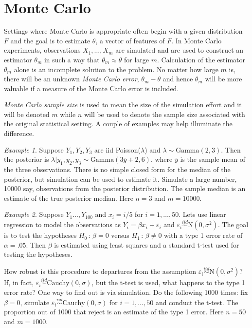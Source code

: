 \documentclass[12pt]{article}
\theoremstyle{plain}
\theoremstyle{definition}
\theoremstyle{remark}
\newtheorem{example}{Example}[section]
\begin{document}
\section{Monte Carlo}
\label{gofmc:sec:Monte Carlo}

Settings where Monte Carlo is appropriate often begin with a given
distribution $F$ and the goal is to estimate $\theta$, a vector of
features of $F$.  In Monte Carlo experiments, observations
$X_{1}, \ldots, X_{m}$ are simulated and are used to construct an
estimator $\theta_m$ in such a way that $\theta_m \approx \theta$ for
large $m$.  Calculation of the estimator $\theta_m$ alone is an
incomplete solution to the problem. No matter how large $m$ is, there
will be an unknown \textit{Monte Carlo error}, $\theta_m - \theta$ and
hence $\theta_m$ will be more valuable if a measure of the
Monte Carlo error is included. 

\textit{Monte Carlo sample size} is used to mean the size of the
simulation effort and it will be denoted $m$ while $n$ will be used to
denote the sample size associated with the original statistical
setting.  A couple of examples may help illuminate the difference.

\begin{example}
  Suppose $Y_1,Y_2, Y_3$ are iid Poisson($\lambda$) and $\lambda \sim
  \text{Gamma}(2,3)$.  Then the posterior is $\lambda| y_1, y_2, y_3
  \sim \text{Gamma}(3\bar{y} + 2, 6)$, where $\bar{y}$ is the sample
  mean of the three observations.  There is no simple closed form for
  the median of the posterior, but simulation can be used to estimate
  it.  Simulate a large number, 10000 say, observations from the
  posterior distribution.  The sample median is an estimate of the
  true posterior median.  Here $n=3$ and $m=10000$.
\end{example}

\begin{example}
  Suppose $Y_1 \ldots, Y_{100}$ and $x_i = i/5$ for $i=1,
  \ldots, 50$. Lets use linear regression to model the observations
  as $Y_i=\beta x_i + \varepsilon_i$ and $\varepsilon_i
  \stackrel{iid}{\sim}\text{N}(0, \sigma^2)$.  The goal is to test the
  hypotheses $H_0 \, : \, \beta=0$ versus $H_1 \, : \, \beta \neq 0$
  with a type 1 error rate of $\alpha=.05$.  Then $\beta$ is estimated
  using least squares and a standard t-test used for testing the
  hypotheses.

  How robust is this procedure to departures from the assumption
  $\varepsilon_i \stackrel{iid}{\sim}\text{N}(0, \sigma^2)$?  If, in
  fact, $\varepsilon_i \stackrel{iid}{\sim} \text{Cauchy}(0, \sigma)$,
  but the t-test is used, what happens to the type 1 error
  rate?  One way to find out is via simulation.  Do the following 1000
  times: fix $\beta=0$, simulate $\varepsilon_i \stackrel{iid}{\sim}
  \text{Cauchy}(0, \sigma)$ for $i=1, \ldots, 50$ and conduct the
  t-test.  The proportion out of 1000 that reject is an estimate of
  the type 1 error.  Here $n=50$ and $m = 1000$.
\end{example}
\end{document}
